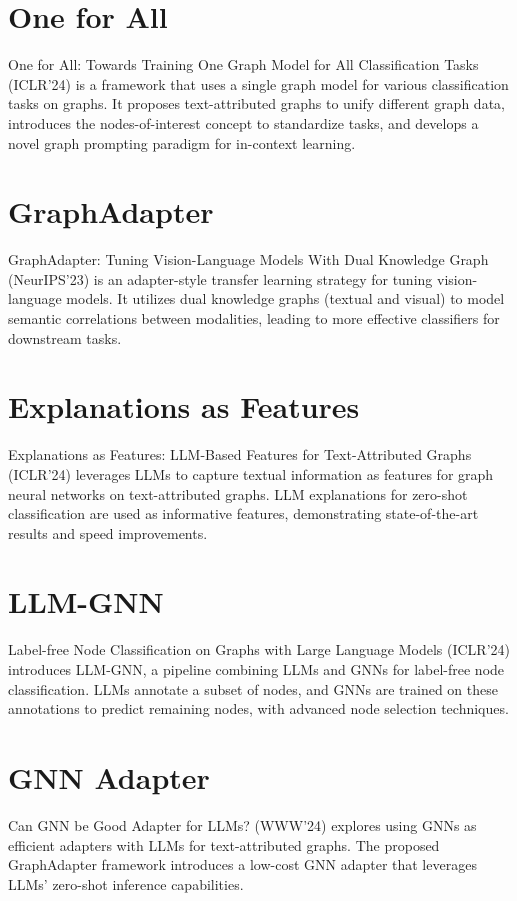 \documentclass{sigkddExp}
\begin{document}
\section{One for All}
\vspace{3mm}
One for All: Towards Training One Graph Model for All Classification Tasks (ICLR'24) is a framework that uses a single graph model for various classification tasks on graphs. It proposes text-attributed graphs to unify different graph data, introduces the nodes-of-interest concept to standardize tasks, and develops a novel graph prompting paradigm for in-context learning.

\section{GraphAdapter}
\vspace{3mm}
GraphAdapter: Tuning Vision-Language Models With Dual Knowledge Graph (NeurIPS'23) is an adapter-style transfer learning strategy for tuning vision-language models. It utilizes dual knowledge graphs (textual and visual) to model semantic correlations between modalities, leading to more effective classifiers for downstream tasks.

\section{Explanations as Features}
\vspace{3mm}
Explanations as Features: LLM-Based Features for Text-Attributed Graphs (ICLR'24) leverages LLMs to capture textual information as features for graph neural networks on text-attributed graphs. LLM explanations for zero-shot classification are used as informative features, demonstrating state-of-the-art results and speed improvements.

\section{LLM-GNN}
\vspace{3mm}
Label-free Node Classification on Graphs with Large Language Models (ICLR'24) introduces LLM-GNN, a pipeline combining LLMs and GNNs for label-free node classification. LLMs annotate a subset of nodes, and GNNs are trained on these annotations to predict remaining nodes, with advanced node selection techniques.

\section{GNN Adapter}
\vspace{3mm}
Can GNN be Good Adapter for LLMs? (WWW'24) explores using GNNs as efficient adapters with LLMs for text-attributed graphs. The proposed GraphAdapter framework introduces a low-cost GNN adapter that leverages LLMs' zero-shot inference capabilities.
\end{document}
